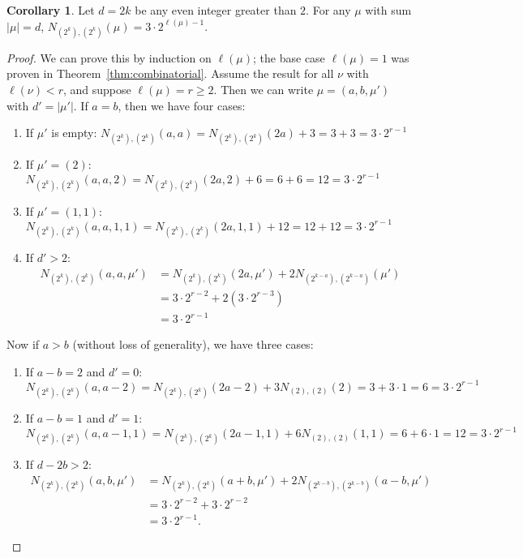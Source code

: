 \documentclass[thesis]{thesis-umich}           %
\theoremstyle{definition}
\newtheorem{cor}[thm]{Corollary}
\begin{document}
\begin{cor}
  \label{cor:twos}
  Let $d=2k$ be any even integer greater than $2$. For any $\mu$ with sum $|\mu|=d$, $N_{(2^k),(2^k)}(\mu)=3\cdot 2^{\ell(\mu)-1}$.
\end{cor}
\begin{proof}
  We can prove this by induction on $\ell(\mu)$; the base case $\ell(\mu)=1$ was proven in Theorem~\ref{thm:combinatorial}. Assume
  the result for all $\nu$ with $\ell(\nu)< r$, and suppose $\ell(\mu)=r\geq 2$.
  Then we can write $\mu=(a,b,\mu')$ with $d'=|\mu'|$. If $a=b$, then we have
  four cases:
  \begin{enumerate}
  \item If $\mu'$ is empty: $N_{(2^k),(2^k)}(a,a)=N_{(2^k),(2^k)}(2a)+3=3+3=3\cdot 2^{r-1}$
  \item If $\mu'=(2)$: $N_{(2^k),(2^k)}(a,a,2)=N_{(2^k),(2^k)}(2a,2)+6=6+6=12=3\cdot 2^{r-1}$
  \item If $\mu'=(1,1)$: $N_{(2^k),(2^k)}(a,a,1,1)=N_{(2^k),(2^k)}(2a,1,1)+12=12+12=3\cdot 2^{r-1}$
  \item If $d'>2$:
      \begin{align*}
    N_{(2^k),(2^k)}(a,a,\mu') &= N_{(2^k),(2^k)}(2a,\mu')+2N_{(2^{k-a}),(2^{k-a})}(\mu') \\
    &=3\cdot 2^{r-2}+2(3\cdot 2^{r-3}) \\
    &=3\cdot 2^{r-1}
  \end{align*}

    \end{enumerate}
  Now if $a>b$ (without loss of generality), we have three cases:
  \begin{enumerate}
  \item If $a-b=2$ and $d'=0$:
    \[
    N_{(2^k),(2^k)}(a,a-2)=N_{(2^k),(2^k)}(2a-2)+3N_{(2),(2)}(2)=3+3\cdot 1=6=3\cdot 2^{r-1}
    \]
  \item If $a-b=1$ and $d'=1$:
    \[
    N_{(2^k),(2^k)}(a,a-1,1)=N_{(2^k),(2^k)}(2a-1,1)+6N_{(2),(2)}(1,1)=6+6\cdot 1=12=3\cdot 2^{r-1}
    \]
    \item If $d-2b>2$:
    \begin{align*}
      N_{(2^k),(2^k)}(a,b,\mu') &= N_{(2^k),(2^k)}(a+b,\mu')+2N_{(2^{k-b}),(2^{k-b})}(a-b,\mu') \\
      &= 3\cdot 2^{r-2}+3\cdot 2^{r-2} \\
      &= 3\cdot 2^{r-1}.
    \end{align*}
    \end{enumerate}
  \end{proof}
\end{document}
